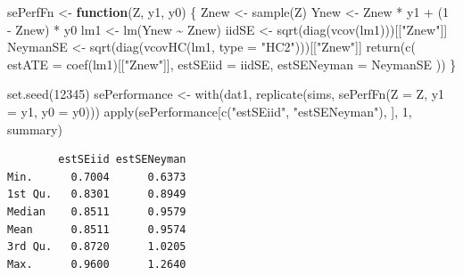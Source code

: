 \documentclass[
  12pt,
]{book}
\newenvironment{Shaded}{\begin{snugshade}}{\end{snugshade}}
\newcommand{\AttributeTok}[1]{\textcolor[rgb]{0.77,0.63,0.00}{#1}}
\newcommand{\ControlFlowTok}[1]{\textcolor[rgb]{0.13,0.29,0.53}{\textbf{#1}}}
\newcommand{\DecValTok}[1]{\textcolor[rgb]{0.00,0.00,0.81}{#1}}
\newcommand{\FunctionTok}[1]{\textcolor[rgb]{0.00,0.00,0.00}{#1}}
\newcommand{\NormalTok}[1]{#1}
\newcommand{\OtherTok}[1]{\textcolor[rgb]{0.56,0.35,0.01}{#1}}
\newcommand{\SpecialCharTok}[1]{\textcolor[rgb]{0.00,0.00,0.00}{#1}}
\newcommand{\StringTok}[1]{\textcolor[rgb]{0.31,0.60,0.02}{#1}}
\theoremstyle{definition}
\theoremstyle{definition}
\theoremstyle{definition}
\theoremstyle{remark}
\begin{document}
\begin{Shaded}
\begin{Highlighting}[]
\NormalTok{sePerfFn }\OtherTok{\textless{}{-}} \ControlFlowTok{function}\NormalTok{(Z, y1, y0) \{}
\NormalTok{  Znew }\OtherTok{\textless{}{-}} \FunctionTok{sample}\NormalTok{(Z)}
\NormalTok{  Ynew }\OtherTok{\textless{}{-}}\NormalTok{ Znew }\SpecialCharTok{*}\NormalTok{ y1 }\SpecialCharTok{+}\NormalTok{ (}\DecValTok{1} \SpecialCharTok{{-}}\NormalTok{ Znew) }\SpecialCharTok{*}\NormalTok{ y0}
\NormalTok{  lm1 }\OtherTok{\textless{}{-}} \FunctionTok{lm}\NormalTok{(Ynew }\SpecialCharTok{\textasciitilde{}}\NormalTok{ Znew)}
\NormalTok{  iidSE }\OtherTok{\textless{}{-}} \FunctionTok{sqrt}\NormalTok{(}\FunctionTok{diag}\NormalTok{(}\FunctionTok{vcov}\NormalTok{(lm1)))[[}\StringTok{"Znew"}\NormalTok{]]}
\NormalTok{  NeymanSE }\OtherTok{\textless{}{-}} \FunctionTok{sqrt}\NormalTok{(}\FunctionTok{diag}\NormalTok{(}\FunctionTok{vcovHC}\NormalTok{(lm1, }\AttributeTok{type =} \StringTok{"HC2"}\NormalTok{)))[[}\StringTok{"Znew"}\NormalTok{]]}
  \FunctionTok{return}\NormalTok{(}\FunctionTok{c}\NormalTok{(}
    \AttributeTok{estATE =} \FunctionTok{coef}\NormalTok{(lm1)[[}\StringTok{"Znew"}\NormalTok{]],}
    \AttributeTok{estSEiid =}\NormalTok{ iidSE,}
    \AttributeTok{estSENeyman =}\NormalTok{ NeymanSE}
\NormalTok{  ))}
\NormalTok{\}}
\end{Highlighting}
\end{Shaded}

\begin{Shaded}
\begin{Highlighting}[]
\FunctionTok{set.seed}\NormalTok{(}\DecValTok{12345}\NormalTok{)}
\NormalTok{sePerformance }\OtherTok{\textless{}{-}} \FunctionTok{with}\NormalTok{(dat1, }\FunctionTok{replicate}\NormalTok{(sims, }\FunctionTok{sePerfFn}\NormalTok{(}\AttributeTok{Z =}\NormalTok{ Z, }\AttributeTok{y1 =}\NormalTok{ y1, }\AttributeTok{y0 =}\NormalTok{ y0)))}
\FunctionTok{apply}\NormalTok{(sePerformance[}\FunctionTok{c}\NormalTok{(}\StringTok{"estSEiid"}\NormalTok{, }\StringTok{"estSENeyman"}\NormalTok{), ], }\DecValTok{1}\NormalTok{, summary)}
\end{Highlighting}
\end{Shaded}

\begin{verbatim}
        estSEiid estSENeyman
Min.      0.7004      0.6373
1st Qu.   0.8301      0.8949
Median    0.8511      0.9579
Mean      0.8511      0.9574
3rd Qu.   0.8720      1.0205
Max.      0.9600      1.2640
\end{verbatim}
\end{document}
